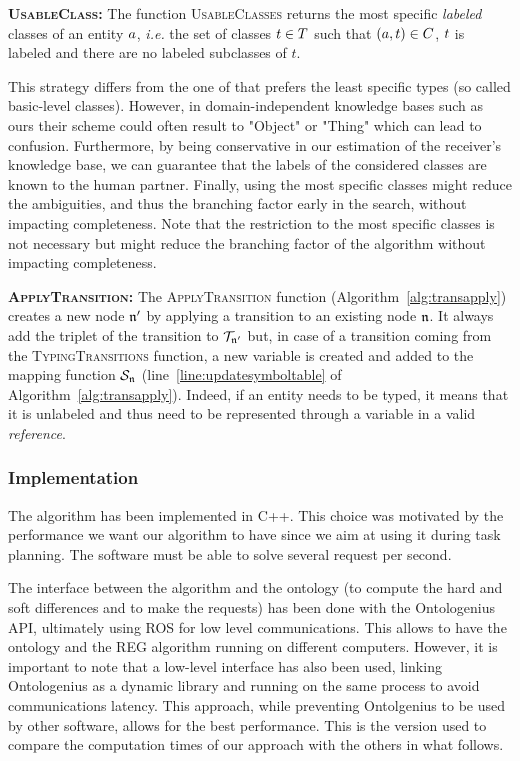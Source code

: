 \documentclass[a4paper,11pt,twoside]{StyleThese}
\begin{document}
\textbf{\textsc{UsableClass}:}
The function \textsc{UsableClasses} returns the most specific \textit{labeled} classes of an entity $a$, \textit{i.e.} the set of classes $t \in T$ such that $(a, t) \in C$, $t$ is labeled and there are no labeled subclasses of $t$.

This strategy differs from the one of \cite{dale1995computational} that prefers the least specific types (so called basic-level classes).
However, in domain-independent knowledge bases such as ours their scheme could often result to "Object" or "Thing" which can lead to confusion.
Furthermore, by being conservative in our estimation of the receiver's knowledge base, we can guarantee that the labels of the considered classes are known to the human partner.
Finally, using the most specific classes might reduce the ambiguities, and thus the branching factor early in the search, without impacting completeness.
Note that the restriction to the most specific classes is not necessary but might reduce the branching factor of the algorithm without impacting completeness.

\textbf{\textsc{ApplyTransition}:}
The \textsc{ApplyTransition} function (Algorithm~\ref{alg:transapply}) creates a new node $\mathfrak{n}'$ by applying a transition to an existing node $\mathfrak{n}$. It always add the triplet of the transition to $\mathcal{T}_{\mathfrak{n}'}$ but, in case of a transition coming from the \textsc{TypingTransitions} function, a new variable is created and added to the mapping function $\mathcal{S}_{\mathfrak{n}}$ (line~\ref{line:updatesymboltable} of Algorithm~\ref{alg:transapply}). Indeed, if an entity needs to be typed, it means that it is unlabeled and thus need to be represented through a variable in a valid \textit{reference}.



\subsubsection{Implementation}

The algorithm has been implemented in C++. This choice was motivated by the performance we want our algorithm to have since we aim at using it during task planning. The software must be able to solve several request per second.

The interface between the algorithm and the ontology (to compute the hard and soft differences and to make the \sparql{} requests) has been done with the Ontologenius API, ultimately using ROS for low level communications. This allows to have the ontology and the REG algorithm running on different computers. However, it is important to note that a low-level interface has also been used, linking Ontologenius as a dynamic library and running on the same process to avoid communications latency. This approach, while preventing Ontolgenius to be used by other software, allows for the best performance. This is the version used to compare the computation times of our approach with the others in what follows.
\end{document}
